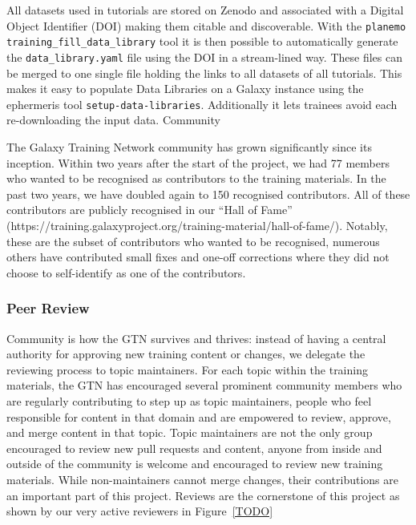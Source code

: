 \documentclass[10pt,letterpaper]{article}
\begin{document}
All datasets used in tutorials are stored on Zenodo and associated with a Digital Object Identifier (DOI) making them citable and discoverable.
With the \verb+planemo training_fill_data_library+ tool it is then possible to automatically generate the \verb+data_library.yaml+ file using the DOI in a stream-lined way.
These files can be merged to one single file holding the links to all datasets of all tutorials.
This makes it easy to populate Data Libraries on a Galaxy instance using the ephermeris tool \verb+setup-data-libraries+.
Additionally it lets trainees avoid each re-downloading the input data.
Community

The Galaxy Training Network community has grown significantly since its inception. Within two years after the start of the project, we had 77 members who wanted to be recognised as contributors to the training materials.
In the past two years, we have doubled again to 150 recognised contributors.
All of these contributors are publicly recognised in our “Hall of Fame” (https://training.galaxyproject.org/training-material/hall-of-fame/).
Notably, these are the subset of contributors who wanted to be recognised, numerous others have contributed small fixes and one-off corrections where they did not choose to self-identify as one of the contributors.

\subsubsection*{Peer Review}
Community is how the GTN survives and thrives: instead of having a central authority for approving new training content or changes, we delegate the reviewing process to topic maintainers.
For each topic within the training materials, the GTN has encouraged several prominent community members who are regularly contributing to step up as topic maintainers, people who feel responsible for content in that domain and are empowered to review, approve, and merge content in that topic.
Topic maintainers are not the only group encouraged to review new pull requests and content, anyone from inside and outside of the community is welcome and encouraged to review new training materials.
While non-maintainers cannot merge changes, their contributions are an important part of this project. Reviews are the cornerstone of this project as shown by our very active reviewers in Figure~\ref{TODO}
\end{document}
